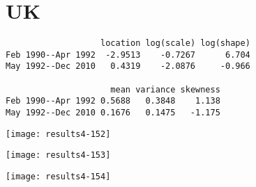 \documentclass[a4paper]{article}
\begin{document}
\newpage

\section*{UK}


\begin{verbatim}
                   location log(scale) log(shape)
Feb 1990--Apr 1992  -2.9513    -0.7267      6.704
May 1992--Dec 2010   0.4319    -2.0876     -0.966

                     mean variance skewness
Feb 1990--Apr 1992 0.5688   0.3848    1.138
May 1992--Dec 2010 0.1676   0.1475   -1.175

\end{verbatim}

\begin{center}
\texttt{[image: results4-152]}

\texttt{[image: results4-153]}

\texttt{[image: results4-154]}
\end{center}
\end{document}
